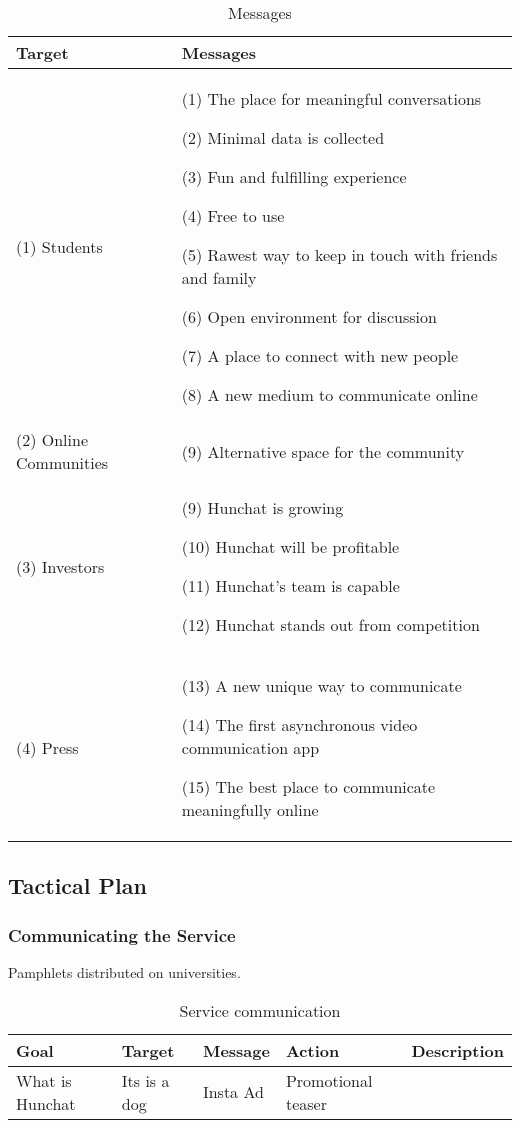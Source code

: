 \documentclass[12pt]{article}
\begin{document}
\begin{table}[htb]
\small
\caption{Messages}
\label{table:msg}
\centering
\begin{tabular}{ @{}P{0.28\textwidth}P{0.62\textwidth}@{} }
Target	&	Messages	\\ \hline
(1) Students \par 	&	(1) The place for meaningful conversations \par (2) Minimal data is collected \par (3) Fun and fulfilling experience \par  (4) Free to use \par (5) Rawest way to keep in touch with friends and family \par (6) Open environment for discussion  \par  (7) A place to connect with new people \par (8) A new medium to communicate online \\
(2) Online Communities & (9) Alternative space for the community \\
(3) Investors	&	(9) Hunchat is growing \par (10) Hunchat will be profitable \par (11) Hunchat's team is capable  \par (12) Hunchat stands out from competition \\
(4) Press	& 	(13) A new unique way to communicate \par (14) The first asynchronous video communication app \par (15) The best place to communicate meaningfully online \\
 \hline
\end{tabular}
\end{table}



\subsection{Tactical Plan}
	\subsubsection{Communicating the Service}
	
	Pamphlets distributed on universities.
	\begin{table}[htbp]
	\small
	\caption{Service communication}
	\label{table:service}
	\centering
	\begin{tabular}{ @{}P{0.18\textwidth}P{0.18\textwidth}P{0.18\textwidth}P{0.18\textwidth}P{0.18\textwidth}@{} }
Goal	&	Target	&	Message	&	Action	&	Description	 \\ \hline
What is Hunchat	&	Its is a dog&	Insta Ad	& 	Promotional teaser
	 \\ \hline
	\end{tabular}
	\end{table}
\end{document}
